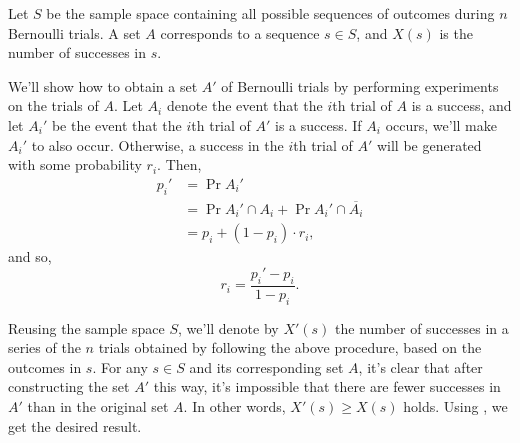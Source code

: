 \starred
Let $S$ be the sample space containing all possible sequences of outcomes during $n$ Bernoulli trials.
A set $A$ corresponds to a sequence $s\in S$, and $X(s)$ is the number of successes in $s$.

We'll show how to obtain a set $A'$ of Bernoulli trials by performing experiments on the trials of $A$.
Let $A_i$ denote the event that the $i$th trial of $A$ is a success, and let $A_i'$ be the event that the $i$th trial of $A'$ is a success.
If $A_i$ occurs, we'll make $A_i'$ to also occur.
Otherwise, a success in the $i$th trial of $A'$ will be generated with some probability $r_i$.
Then,
\begin{align*}
    p_i' &= \Pr{A_i'} \\
    &= \Pr{A_i'\cap A_i}+\Pr{A_i'\cap\overline{A_i}} \\
    &= p_i+(1-p_i)\cdot r_i,
\end{align*}
and so,
\[
    r_i = \frac{p_i'-p_i}{1-p_i}.
\]

Reusing the sample space $S$, we'll denote by $X'(s)$ the number of successes in a series of the $n$ trials obtained by following the above procedure, based on the outcomes in $s$.
For any $s\in S$ and its corresponding set $A$, it's clear that after constructing the set $A'$ this way, it's impossible that there are fewer successes in $A'$ than in the original set $A$.
In other words, $X'(s)\ge X(s)$ holds.
Using , we get the desired result.
